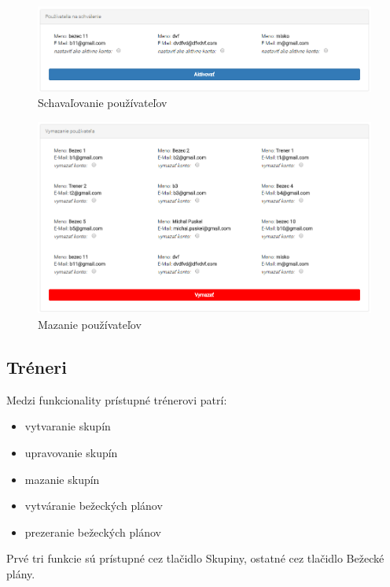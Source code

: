 \documentclass[12pt,a4paper]{report}
\theoremstyle{definition}
\theoremstyle{remark}
\begin{document}
\begin{figure}[H]
\centering
\includegraphics[width=\textwidth]{adminAprove.png}
\caption{Schavaľovanie používateľov \label{adminAprove}}

\end{figure}

\begin{figure}[H]
\centering
\includegraphics[width=\textwidth]{adminDelete.png}
\caption{Mazanie používateľov \label{adminDelete}}
\end{figure}

\subsection{Tréneri}
Medzi funkcionality prístupné trénerovi patrí:
\begin{itemize}
\item vytvaranie skupín
\item upravovanie skupín
\item mazanie skupín
\item vytváranie bežeckých plánov
\item prezeranie bežeckých plánov
\end{itemize}
Prvé tri funkcie sú prístupné cez tlačidlo Skupiny, ostatné cez tlačidlo Bežecké plány.
\end{document}
